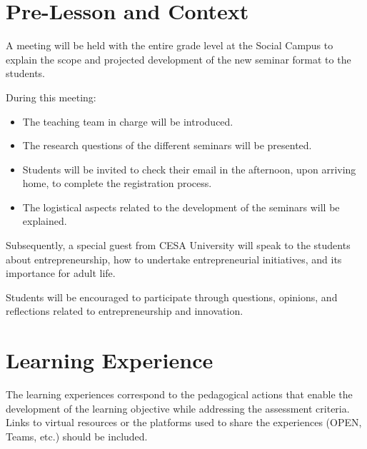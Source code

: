 \documentclass[12pt,a4paper]{article}
\begin{document}
	
	\section{Pre-Lesson and Context}
	
	A meeting will be held with the entire grade level at the Social
	Campus to explain the scope and projected development of the new
	seminar format to the students.
	
	During this meeting:
	
	\begin{itemize}
		
		\item The teaching team in charge will be introduced.
		
		\item The research questions of the different seminars will be
		presented.
		
		\item Students will be invited to check their email in the
		afternoon, upon arriving home, to complete the registration
		process.
		
		\item The logistical aspects related to the development of the
		seminars will be explained.
		
	\end{itemize}
	
	Subsequently, a special guest from CESA University will speak to the
	students about entrepreneurship, how to undertake entrepreneurial
	initiatives, and its importance for adult life.
	
	Students will be encouraged to participate through questions, opinions,
	and reflections related to entrepreneurship and innovation.
	
	
	\section{Learning Experience}
	
	The learning experiences correspond to the pedagogical actions that
	enable the development of the learning objective while addressing the
	assessment criteria. Links to virtual resources or the platforms used
	to share the experiences (OPEN, Teams, etc.) should be included.
	
\end{document}
